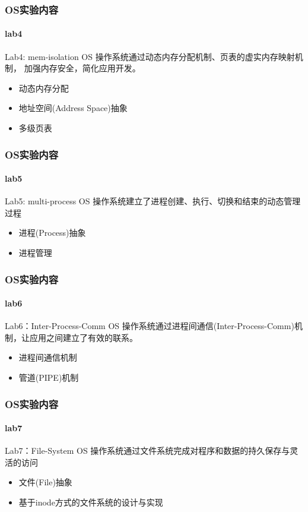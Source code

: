 \begin{frame}
\frametitle{OS实验内容}
\framesubtitle{lab4}

\begin{block}{Lab4: mem-isolation OS}
操作系统通过动态内存分配机制、页表的虚实内存映射机制，
加强内存安全，简化应用开发。
\end{block}

\begin{itemize}
    \item 动态内存分配
    \item 地址空间(Address Space)抽象
    \item 多级页表
\end{itemize}

\end{frame}


\begin{frame}
\frametitle{OS实验内容}
\framesubtitle{lab5}

\begin{block}{Lab5: multi-process OS}
操作系统建立了进程创建、执行、切换和结束的动态管理过程

\end{block}

\begin{itemize}
    \item 进程(Process)抽象
    \item 进程管理
\end{itemize}

\end{frame}

\begin{frame}
\frametitle{OS实验内容}
\framesubtitle{lab6}

\begin{block}{Lab6：Inter-Process-Comm OS}
操作系统通过进程间通信(Inter-Process-Comm)机制，让应用之间建立了有效的联系。
\end{block}

\begin{itemize}
    \item 进程间通信机制
    \item 管道(PIPE)机制
\end{itemize}

\end{frame}


\begin{frame}
\frametitle{OS实验内容}
\framesubtitle{lab7}

\begin{block}{Lab7：File-System OS}
操作系统通过文件系统完成对程序和数据的持久保存与灵活的访问
\end{block}

\begin{itemize}
    \item 文件(File)抽象
    \item 基于inode方式的文件系统的设计与实现
\end{itemize}

\end{frame}


